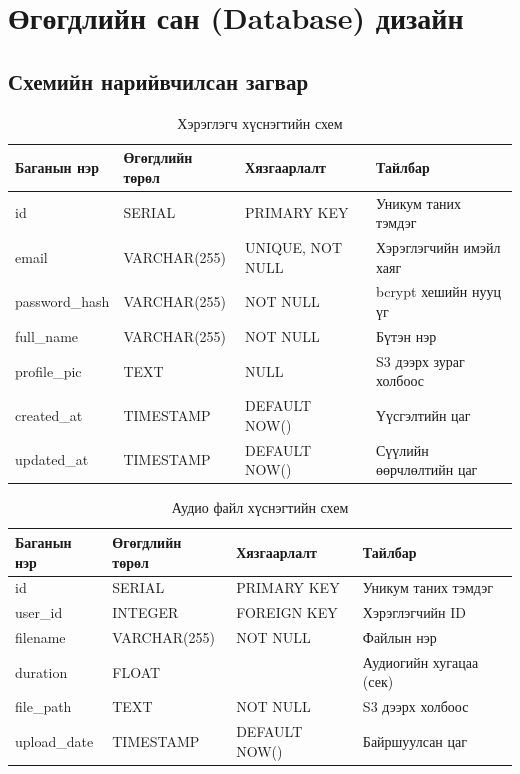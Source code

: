 \section{Өгөгдлийн сан (Database) дизайн}

\subsection{Схемийн нарийвчилсан загвар}

\begin{table}[!htbp]
\caption{Хэрэглэгч хүснэгтийн схем}
\centering
\begin{tabular}{|l|l|l|l|}
\hline
\textbf{Баганын нэр} & \textbf{Өгөгдлийн төрөл} & \textbf{Хязгаарлалт} & \textbf{Тайлбар} \\
\hline
id & SERIAL & PRIMARY KEY & Уникум таних тэмдэг \\
\hline
email & VARCHAR(255) & UNIQUE, NOT NULL & Хэрэглэгчийн имэйл хаяг \\
\hline
password\_hash & VARCHAR(255) & NOT NULL & bcrypt хешийн нууц үг \\
\hline
full\_name & VARCHAR(255) & NOT NULL & Бүтэн нэр \\
\hline
profile\_pic & TEXT & NULL & S3 дээрх зураг холбоос \\
\hline
created\_at & TIMESTAMP & DEFAULT NOW() & Үүсгэлтийн цаг \\
\hline
updated\_at & TIMESTAMP & DEFAULT NOW() & Сүүлийн өөрчлөлтийн цаг \\
\hline
\end{tabular}
\end{table}

\begin{table}[!htbp]
\caption{Аудио файл хүснэгтийн схем}
\centering
\begin{tabular}{|l|l|l|l|}
\hline
\textbf{Баганын нэр} & \textbf{Өгөгдлийн төрөл} & \textbf{Хязгаарлалт} & \textbf{Тайлбар} \\
\hline
id & SERIAL & PRIMARY KEY & Уникум таних тэмдэг \\
\hline
user\_id & INTEGER & FOREIGN KEY & Хэрэглэгчийн ID \\
\hline
filename & VARCHAR(255) & NOT NULL & Файлын нэр \\
\hline
duration & FLOAT & & Аудиогийн хугацаа (сек) \\
\hline
file\_path & TEXT & NOT NULL & S3 дээрх холбоос \\
\hline
upload\_date & TIMESTAMP & DEFAULT NOW() & Байршуулсан цаг \\
\hline
\end{tabular}
\end{table}

